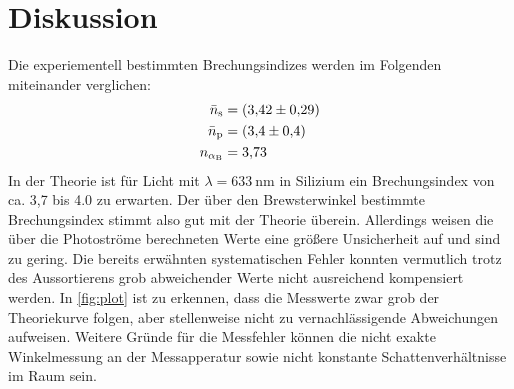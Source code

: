 \section{Diskussion}
\label{sec:Diskussion}
Die experiementell bestimmten Brechungsindizes werden im Folgenden miteinander verglichen:
\begin{align*}
    \bar{n}_{\text{s}}&=\qty{3.42+-0.29}{} \\
    \bar{n}_{\text{p}}&=\qty{3.4+-0.4}{} \\
    n_{\alpha_\text{B}}&=\qty{3.73}{}
\end{align*}
In der Theorie ist für Licht mit $\lambda=\qty{633}{\nano\meter}$ in Silizium ein Brechungsindex von ca. 3,7 bis 4.0
zu erwarten.
Der über den Brewsterwinkel bestimmte Brechungsindex stimmt also gut mit der Theorie überein.
Allerdings weisen die über die Photoströme berechneten Werte eine größere Unsicherheit auf und sind zu gering.
Die bereits erwähnten systematischen Fehler konnten vermutlich trotz des Aussortierens grob abweichender
Werte nicht ausreichend kompensiert werden.
In \autoref{fig:plot} ist zu erkennen, dass die Messwerte zwar grob der Theoriekurve folgen, aber
stellenweise nicht zu vernachlässigende Abweichungen aufweisen.
Weitere Gründe für die Messfehler können die nicht exakte Winkelmessung an der Messapperatur sowie nicht konstante
Schattenverhältnisse im Raum sein.